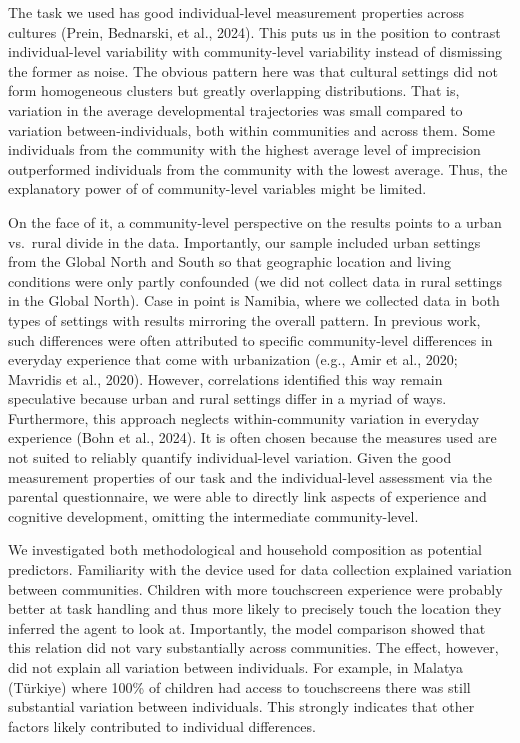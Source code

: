 \documentclass[
  man,floatsintext]{apa7}
\begin{document}
The task we used has good individual-level measurement properties across cultures (Prein, Bednarski, et al., 2024). This puts us in the position to contrast individual-level variability with community-level variability instead of dismissing the former as noise. The obvious pattern here was that cultural settings did not form homogeneous clusters but greatly overlapping distributions. That is, variation in the average developmental trajectories was small compared to variation between-individuals, both within communities and across them. Some individuals from the community with the highest average level of imprecision outperformed individuals from the community with the lowest average. Thus, the explanatory power of of community-level variables might be limited.

On the face of it, a community-level perspective on the results points to a urban vs.~rural divide in the data. Importantly, our sample included urban settings from the Global North and South so that geographic location and living conditions were only partly confounded (we did not collect data in rural settings in the Global North). Case in point is Namibia, where we collected data in both types of settings with results mirroring the overall pattern. In previous work, such differences were often attributed to specific community-level differences in everyday experience that come with urbanization (e.g., Amir et al., 2020; Mavridis et al., 2020). However, correlations identified this way remain speculative because urban and rural settings differ in a myriad of ways. Furthermore, this approach neglects within-community variation in everyday experience (Bohn et al., 2024). It is often chosen because the measures used are not suited to reliably quantify individual-level variation. Given the good measurement properties of our task and the individual-level assessment via the parental questionnaire, we were able to directly link aspects of experience and cognitive development, omitting the intermediate community-level.

We investigated both methodological and household composition as potential predictors. Familiarity with the device used for data collection explained variation between communities. Children with more touchscreen experience were probably better at task handling and thus more likely to precisely touch the location they inferred the agent to look at. Importantly, the model comparison showed that this relation did not vary substantially across communities. The effect, however, did not explain all variation between individuals. For example, in Malatya (Türkiye) where 100\% of children had access to touchscreens there was still substantial variation between individuals. This strongly indicates that other factors likely contributed to individual differences.
\end{document}
